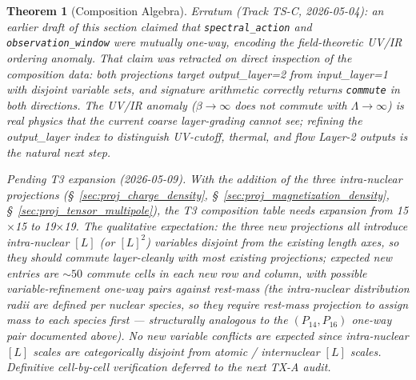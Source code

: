 \documentclass[11pt]{article}
\newtheorem{theorem}{Theorem}
\begin{document}
\begin{theorem}[Composition Algebra]
\textit{Erratum (Track TS-C, 2026-05-04):} an earlier draft of this
section claimed that \texttt{spectral\_action} and
\texttt{observation\_window} were mutually one-way, encoding the
field-theoretic UV/IR ordering anomaly.  That claim was retracted
on direct inspection of the composition data: both projections
target output\_layer=2 from input\_layer=1 with disjoint variable
sets, and signature arithmetic correctly returns \texttt{commute}
in both directions.  The UV/IR anomaly ($\beta \to \infty$ does not
commute with $\Lambda \to \infty$) is real physics that the current
coarse layer-grading cannot see; refining the output\_layer index
to distinguish UV-cutoff, thermal, and flow Layer-2 outputs is the
natural next step.

\textit{Pending T3 expansion (2026-05-09).}  With the addition of
the three intra-nuclear projections
(\S~\ref{sec:proj_charge_density},
\S~\ref{sec:proj_magnetization_density},
\S~\ref{sec:proj_tensor_multipole}), the T3 composition table needs
expansion from 15$\times$15 to 19$\times$19.  The qualitative
expectation: the three new projections all introduce intra-nuclear
$[L]$ (or $[L]^2$) variables disjoint from the existing length
axes, so they should commute layer-cleanly with most existing
projections; expected new entries are $\sim 50$ commute cells in
each new row and column, with possible variable-refinement one-way
pairs against rest-mass (the intra-nuclear distribution radii are
defined per nuclear species, so they require rest-mass projection
to assign mass to each species first --- structurally analogous to
the $(P_{14}, P_{16})$ one-way pair documented above).  No new
variable conflicts are expected since intra-nuclear $[L]$ scales
are categorically disjoint from atomic / internuclear $[L]$ scales.
Definitive cell-by-cell verification deferred to the next TX-A
audit.
\end{theorem}
\end{document}
